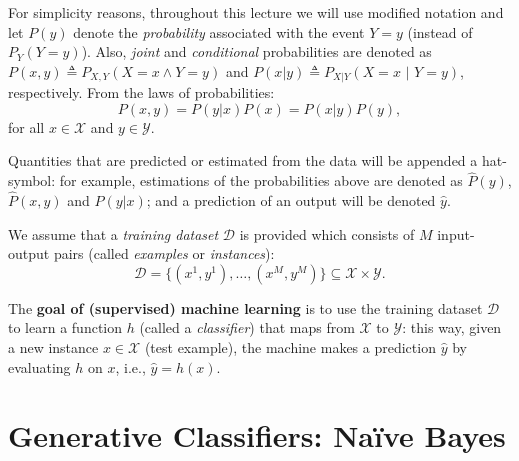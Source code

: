 For simplicity reasons, throughout this lecture we will use modified notation and let $P(y)$ denote the \emph{probability} associated with the event $Y=y$ (instead of $P_Y(Y=y)$). 
Also, \emph{joint} and \emph{conditional} probabilities are 
denoted as $P(x,y) \triangleq P_{X,Y}(X=x \wedge Y=y)$ and $P(x|y) \triangleq P_{X|Y}(X=x \,\,|\,\,Y=y)$, respectively. From the laws of probabilities: 
\begin{equation}
P(x,y)=P(y|x) P(x) = P(x|y) P(y), 
\end{equation}
for all $x \in \mathcal{X}$ and $y \in \mathcal{Y}$.

Quantities that are predicted or estimated from the data will be appended a hat-symbol: for example, estimations of the probabilities above are denoted 
as ${\hat P}(y)$, ${\hat P}(x,y)$ and ${\hat P}(y|x)$; and a prediction of an output will be denoted ${\hat y}$. 

We assume that a \emph{training dataset} $\mathcal{D}$ is provided
which consists of $M$ input-output pairs (called \emph{examples} or
\emph{instances}): 
\begin{equation}
\mathcal{D} = \{(x^{1},y^{1}),\ldots,(x^{M},y^{M})\} \subseteq \mathcal{X} \times \mathcal{Y}.  
\end{equation}

The \textbf{goal of (supervised) machine learning} is to use the training dataset $\mathcal{D}$ to learn a function $h$ (called a \emph{classifier}) 
that maps from $\mathcal{X}$ to $\mathcal{Y}$: this way, given a new instance 
$x \in \mathcal{X}$ (test example), the machine makes a prediction ${\hat y}$ by evaluating $h$ on $x$, i.e., ${\hat y} = h(x)$. 


\section{\label{s::naiveBayes}Generative Classifiers: Na\"{i}ve Bayes}

